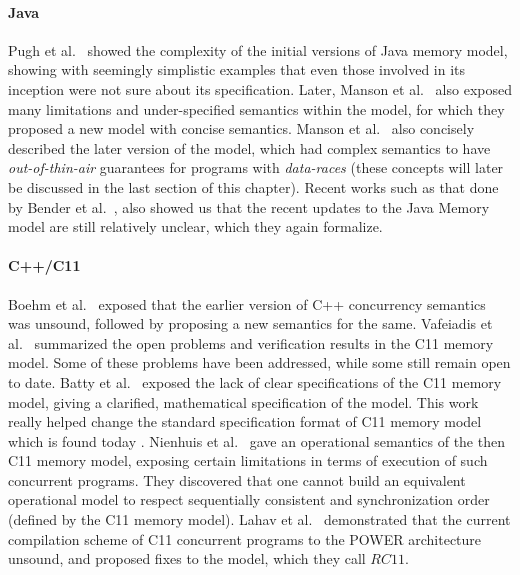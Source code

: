     \paragraph{Java}
    Pugh et al.~\cite{Pugh} showed the complexity of the initial versions of Java memory model, showing with seemingly simplistic examples that even those involved in its inception were not sure about its specification. 
    Later, Manson et al.~\cite{JeremyM} also exposed many limitations and under-specified semantics within the model, for which they proposed a new model with concise semantics. 
    Manson et al.~\cite{Manson2} also concisely described the later version of the model, which had complex semantics to have \textit{out-of-thin-air} guarantees for programs with \textit{data-races} (these concepts will later be discussed in the last section of this chapter). 
    Recent works such as that done by Bender et al.~\cite{BenderJ}, also showed us that the recent updates to the Java Memory model are still relatively unclear, which they again formalize. 
    
    \paragraph{C++/C11}
    Boehm et al.~\cite{Boehm} exposed that the earlier version of C++ concurrency semantics was unsound, followed by proposing a new semantics for the same.
    Vafeiadis et al.~\cite{Vafeiadis2} summarized the open problems and verification results in the C11 memory model. Some of these problems have been addressed, while some still remain open to date. 
    Batty et al.~\cite{BattyM} exposed the lack of clear specifications of the C11 memory model, giving a clarified, mathematical specification of the model. This work really helped change the standard specification format of C11 memory model which is found today \cite{C11MM}. 
    Nienhuis et al.~\cite{Nienhuis} gave an operational semantics of the then C11 memory model, exposing certain limitations in terms of execution of such concurrent programs. They discovered that one cannot build an equivalent operational model to respect sequentially consistent and synchronization order (defined by the C11 memory model).
    Lahav et al.~\cite{Lahav} demonstrated that the current compilation scheme of C11 concurrent programs to the POWER architecture unsound, and proposed fixes to the model, which they call $RC11$.
    
